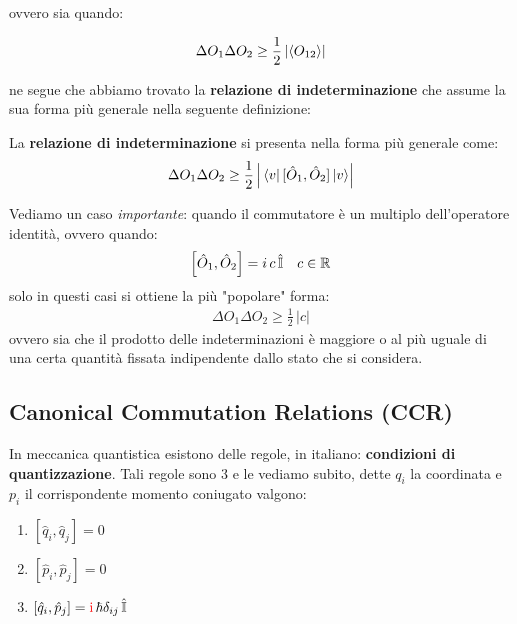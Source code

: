 	ovvero sia quando:
	
\begin{align*}
	\Delta O_1 \Delta O_2 \geq \frac{1}{2} \, |\langle O_{12} \rangle|
\end{align*}

	ne segue che abbiamo trovato la  \textbf{relazione di indeterminazione} che assume la sua forma più generale nella seguente definizione:

\begin{mydef}
	La \textbf{relazione di indeterminazione} si presenta nella forma più generale come:
\begin{align*}
	\Delta O_1 \Delta O_2 \geq \frac{1}{2} \, \abs{\mel{v}{\,[\hat{O}_1, \hat{O}_2 ] \,}{v}}
\end{align*}
\end{mydef}

\begin{myapprf}
	Vediamo un caso \textit{importante}: quando il commutatore è un multiplo dell'operatore identità, ovvero quando:
\begin{align*}
	\qty[\hat{O}_1, \hat{O}_2] = i\, c \, \hat{\mathbb{I}} \quad c \in \mathbb{R}
\end{align*}
	solo in questi casi si ottiene la più "popolare" forma:
\begin{align*}
	\Delta O_1 \Delta O_2 \geq \frac{1}{2} \, |c|
\end{align*}	
	ovvero sia che il prodotto delle indeterminazioni è maggiore o al più uguale di una certa quantità fissata indipendente dallo stato che si considera.
\end{myapprf}

\subsection{Canonical Commutation Relations (CCR)}

	In meccanica quantistica esistono delle regole, in italiano: \textbf{condizioni di quantizzazione}. Tali regole sono 3 e le vediamo subito, dette $q_i$ la coordinata e $p_i$ il corrispondente momento coniugato valgono:
	
\begin{enumerate}[label=\arabic*)]
	\item $[\hat{q}_i, \hat{q}_j] = 0$
	\item $[\hat{p}_i, \hat{p}_j] = 0$
	\item $[\hat{q}_i, \hat{p}_j] = \textcolor{red}{\text{i}} \, \hbar \delta_{ij} \, \hat{\mathbb{I}}$
\end{enumerate}

